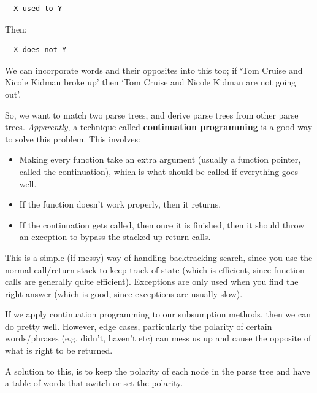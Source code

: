 \begin{verbatim}
  X used to Y
\end{verbatim}

Then:

\begin{verbatim}
  X does not Y
\end{verbatim}

We can incorporate words and their opposites into this too; if `Tom Cruise and
Nicole Kidman broke up' then `Tom Cruise and Nicole Kidman are not going out'.

So, we want to match two parse trees, and derive parse trees from other parse
trees. \textit{Apparently}, a technique called \textbf{continuation programming}
is a good way to solve this problem. This involves:


\begin{itemize}
  \item Making every function take an extra argument (usually a function 
    pointer, called the continuation), which is what should be called if 
    everything goes well.
  \item If the function doesn't work properly, then it returns.
  \item If the continuation gets called, then once it is finished, then it   
    should throw an exception to bypass the stacked up return calls.
\end{itemize}

This is a simple (if messy) way of handling backtracking search, since you use
the normal call/return stack to keep track of state (which is efficient, since
function calls are generally quite efficient). Exceptions are only used when you
find the right answer (which is good, since exceptions are usually slow).

If we apply continuation programming to our subsumption methods, then we can do
pretty well. However, edge cases, particularly the polarity of certain
words/phrases (e.g. didn't, haven't etc) can mess us up and cause the opposite
of what is right to be returned.

A solution to this, is to keep the polarity of each node in the parse tree and
have a table of words that switch or set the polarity.

